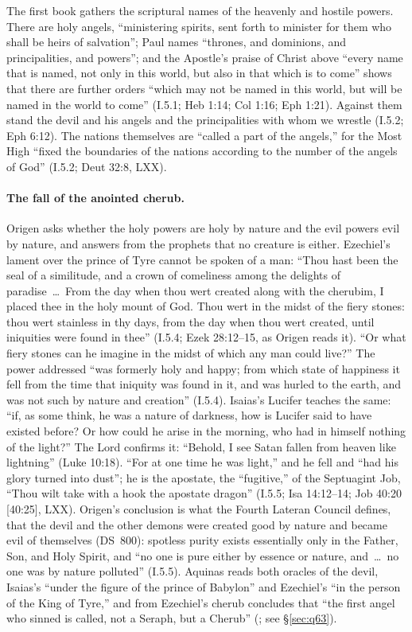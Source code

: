 The first book gathers the scriptural names of the heavenly and hostile
powers. There are holy angels, ``ministering spirits, sent forth to
minister for them who shall be heirs of salvation''; Paul names ``thrones,
and dominions, and principalities, and powers''; and the Apostle's praise
of Christ above ``every name that is named, not only in this world, but
also in that which is to come'' shows that there are further orders ``which
may not be named in this world, but will be named in the world to come''
(I.5.1; Heb 1:14; Col 1:16; Eph 1:21). Against them stand the devil and his angels and the
principalities with whom we wrestle (I.5.2; Eph 6:12). The nations themselves are ``called a part of the
angels,'' for the Most High ``fixed the boundaries of the nations according
to the number of the angels of God'' (I.5.2; Deut 32:8, LXX).

\paragraph{The fall of the anointed cherub.} Origen asks whether the holy
powers are holy by nature and the evil powers evil by nature, and answers
from the prophets that no creature is either. Ezechiel's lament over the
prince of Tyre cannot be spoken of a man: ``Thou hast been the seal of a
similitude, and a crown of comeliness among the delights of paradise~\dots\
From the day when thou wert created along with the cherubim, I placed thee
in the holy mount of God. Thou wert in the midst of the fiery stones: thou
wert stainless in thy days, from the day when thou wert created, until
iniquities were found in thee'' (I.5.4; Ezek 28:12--15, as Origen reads
it). ``Or what fiery stones can he imagine in the midst of which any man
could live?'' The power addressed ``was formerly holy and happy; from which state
of happiness it fell from the time that iniquity was found in it, and was
hurled to the earth, and was not such by nature and creation'' (I.5.4).
Isaias's Lucifer teaches the same: ``if, as some think, he was a nature of
darkness, how is Lucifer said to have existed before? Or how could he arise
in the morning, who had in himself nothing of the light?'' The Lord
confirms it: ``Behold, I see Satan fallen from heaven like lightning''
(Luke 10:18). ``For at one time he was light,'' and he fell and ``had his
glory turned into dust''; he is the apostate, the ``fugitive,'' of the
Septuagint Job, ``Thou wilt take with a hook the apostate dragon''
(I.5.5; Isa 14:12--14; Job 40:20 [40:25], LXX). Origen's conclusion is what the
Fourth Lateran Council defines, that the devil and the other demons were
created good by nature and became evil of themselves (DS~800): spotless
purity exists essentially only in the Father, Son, and Holy Spirit, and ``no one is pure
either by essence or nature, and~\dots\ no one was by nature polluted''
(I.5.5). Aquinas reads both oracles of the devil, Isaias's ``under the
figure of the prince of Babylon'' and Ezechiel's ``in the person of the King
of Tyre,'' and from Ezechiel's cherub concludes that ``the first angel who
sinned is called, not a Seraph, but a Cherub'' (\ST{I q.~63 a.~5; a.~7
ad~1}; see \S\ref{sec:q63}).

